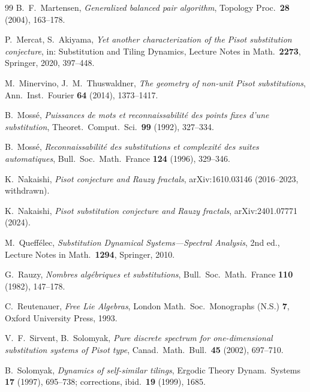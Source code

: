 \documentclass[11pt]{amsart}
\theoremstyle{plain}
\theoremstyle{definition}
\theoremstyle{remark}
\begin{document}
\begin{thebibliography}{99}
 B.~F.~Martensen, \emph{Generalized balanced pair algorithm}, Topology Proc.\ \textbf{28} (2004), 163--178.

 P.~Mercat, S.~Akiyama, \emph{Yet another characterization of the Pisot substitution conjecture}, in: Substitution and Tiling Dynamics, Lecture Notes in Math.\ \textbf{2273}, Springer, 2020, 397--448.

 M.~Minervino, J.~M.~Thuswaldner, \emph{The geometry of non-unit Pisot substitutions}, Ann.\ Inst.\ Fourier \textbf{64} (2014), 1373--1417.

 B.~Moss\'e, \emph{Puissances de mots et reconnaissabilit\'e des points fixes d'une substitution}, Theoret.\ Comput.\ Sci.\ \textbf{99} (1992), 327--334.

 B.~Moss\'e, \emph{Reconnaissabilit\'e des substitutions et complexit\'e des suites automatiques}, Bull.\ Soc.\ Math.\ France \textbf{124} (1996), 329--346.

 K.~Nakaishi, \emph{Pisot conjecture and Rauzy fractals}, arXiv:1610.03146 (2016--2023, withdrawn).

 K.~Nakaishi, \emph{Pisot substitution conjecture and Rauzy fractals}, arXiv:2401.07771 (2024).

 M.~Queff\'elec, \emph{Substitution Dynamical Systems---Spectral Analysis}, 2nd ed., Lecture Notes in Math.\ \textbf{1294}, Springer, 2010.

 G.~Rauzy, \emph{Nombres alg\'ebriques et substitutions}, Bull.\ Soc.\ Math.\ France \textbf{110} (1982), 147--178.

 C.~Reutenauer, \emph{Free Lie Algebras}, London Math.\ Soc.\ Monographs (N.S.) \textbf{7}, Oxford University Press, 1993.

 V.~F.~Sirvent, B.~Solomyak, \emph{Pure discrete spectrum for one-dimensional substitution systems of Pisot type}, Canad.\ Math.\ Bull.\ \textbf{45} (2002), 697--710.

 B.~Solomyak, \emph{Dynamics of self-similar tilings}, Ergodic Theory Dynam.\ Systems \textbf{17} (1997), 695--738; corrections, ibid.\ \textbf{19} (1999), 1685.

\end{thebibliography}
\end{document}
